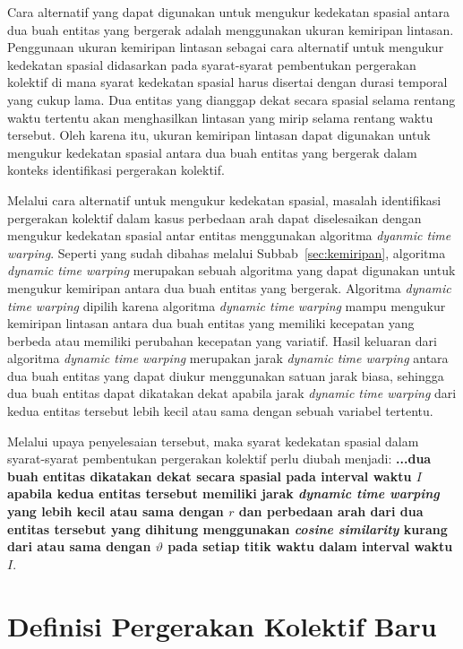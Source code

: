 Cara alternatif yang dapat digunakan untuk mengukur kedekatan spasial antara dua buah entitas yang bergerak adalah menggunakan ukuran kemiripan lintasan. Penggunaan ukuran kemiripan lintasan sebagai cara alternatif untuk mengukur kedekatan spasial didasarkan pada syarat-syarat pembentukan pergerakan kolektif di mana syarat kedekatan spasial harus disertai dengan durasi temporal yang cukup lama. Dua entitas yang dianggap dekat secara spasial selama rentang waktu tertentu akan menghasilkan lintasan yang mirip selama rentang waktu tersebut. Oleh karena itu, ukuran kemiripan lintasan dapat digunakan untuk mengukur kedekatan spasial antara dua buah entitas yang bergerak dalam konteks identifikasi pergerakan kolektif.

Melalui cara alternatif untuk mengukur kedekatan spasial, masalah identifikasi pergerakan kolektif dalam kasus perbedaan arah dapat diselesaikan dengan mengukur kedekatan spasial antar entitas menggunakan algoritma \textit{dyanmic time warping}. Seperti yang sudah dibahas melalui Subbab~\ref{sec:kemiripan}, algoritma \textit{dynamic time warping} merupakan sebuah algoritma yang dapat digunakan untuk mengukur kemiripan antara dua buah entitas yang bergerak. Algoritma \textit{dynamic time warping} dipilih karena algoritma \textit{dynamic time warping} mampu mengukur kemiripan lintasan antara dua buah entitas yang memiliki kecepatan yang berbeda atau memiliki perubahan kecepatan yang variatif. Hasil keluaran dari algoritma \textit{dynamic time warping} merupakan jarak \textit{dynamic time warping} antara dua buah entitas yang dapat diukur menggunakan satuan jarak biasa, sehingga dua buah entitas dapat dikatakan dekat apabila jarak \textit{dynamic time warping} dari kedua entitas tersebut lebih kecil atau sama dengan sebuah variabel tertentu.

Melalui upaya penyelesaian tersebut, maka syarat kedekatan spasial dalam syarat-syarat pembentukan pergerakan kolektif perlu diubah menjadi: \textbf{...dua buah entitas dikatakan dekat secara spasial pada interval waktu $I$ apabila kedua entitas tersebut memiliki jarak \textit{dynamic time warping} yang lebih kecil atau sama dengan $r$ dan perbedaan arah dari dua entitas tersebut yang dihitung menggunakan \textit{cosine similarity} kurang dari atau sama dengan $\vartheta$ pada setiap titik waktu dalam interval waktu $I$}.

\section{Definisi Pergerakan Kolektif Baru}
\label{sec:definisi}

